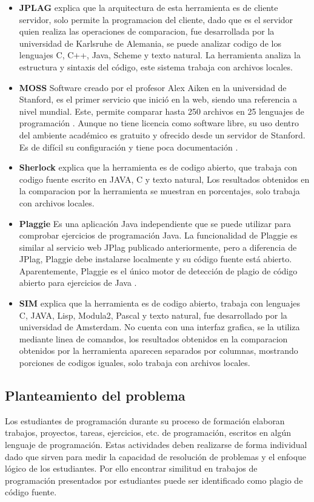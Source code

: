 \begin{itemize}
  \item \textbf{JPLAG} \cite{Banchoff2007} explica que la arquitectura de esta herramienta es de cliente servidor, solo  permite la programacion del cliente, dado que es el servidor quien realiza las operaciones de comparacion, fue desarrollada por la universidad de Karlsruhe de Alemania, se puede analizar codigo de los lenguajes C, C++, Java, Scheme y texto natural. La herramienta analiza la estructura y sintaxis del código, este sistema trabaja con archivos locales.
  \item \textbf{MOSS} Software creado por el profesor Alex Aiken en la universidad de Stanford, es el primer servicio que inició en la web, siendo una referencia a nivel mundial. Este, permite comparar hasta 250 archivos en 25 lenguajes de programación \cite{Hage2010ACO}. Aunque no tiene licencia como software libre, su uso dentro del ambiente académico es gratuito y ofrecido desde un servidor de Stanford. Es de difícil su configuración y tiene poca documentación \cite{book1}.
  \item \textbf{Sherlock} \cite{Banchoff2007} explica que la herramienta es de codigo abierto, que trabaja con codigo fuente escrito en JAVA, C y texto natural, Los resultados obtenidos en la comparacion por la herramienta se muestran en porcentajes, solo trabaja con archivos locales.
  \item \textbf{Plaggie} Es una aplicación Java independiente que se puede utilizar para comprobar ejercicios de programación Java. La funcionalidad de Plaggie es similar al servicio web JPlag publicado anteriormente, pero a diferencia de JPlag, Plaggie debe instalarse localmente y su código fuente está abierto. Aparentemente, Plaggie es el único motor de detección de plagio de código abierto para ejercicios de Java \cite{Ahtiainen2006}.
  \item \textbf{SIM} \cite{Banchoff2007} explica que la herramienta es de codigo abierto, trabaja con lenguajes C, JAVA, Lisp, Modula2, Pascal y texto natural, fue desarrollado por la universidad de Amsterdam. No cuenta con una interfaz grafica, se la utiliza mediante linea de comandos, los resultados obtenidos en la comparacion obtenidos por la herramienta aparecen separados por columnas, mostrando porciones de codigos iguales, solo trabaja con archivos locales.
\end{itemize}

\subsection{Planteamiento del problema}
Los estudiantes de programación durante su proceso de formación elaboran trabajos, proyectos, tareas, ejercicios, etc. de programación, escritos en algún lenguaje de programación. Estas actividades deben realizarse de forma individual dado que sirven para medir la capacidad de resolución de problemas y el enfoque lógico de los estudiantes. Por ello encontrar similitud en trabajos de programación presentados por estudiantes puede ser identificado como plagio de código fuente.

